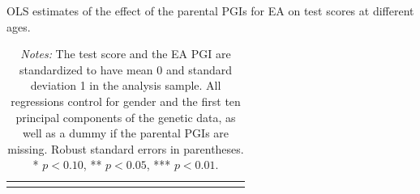 \documentclass[12pt,a4paper]{article}
\begin{document}
\begin{bibunit}
\addtolength{\tabcolsep}{0.3em}
\begin{table}[H]
\caption{OLS estimates of the effect of the parental PGIs for EA on test scores at different ages.}
\centering
{\footnotesize
\begin{tabular}{lcccccccccccccccccccc}
\toprule

\bottomrule
\addlinespace[.75ex]
\end{tabular}
\label{tab:PredictivePowerApp}
}
\caption*{\footnotesize \noindent \textit{Notes:} The test score and the EA PGI are standardized to have mean 0 and standard deviation 1 in the analysis sample. All regressions control for gender and the first ten principal components of the genetic data, as well as a dummy if the parental PGIs are missing. Robust standard errors in parentheses. * $p < 0.10$, ** $p < 0.05$, *** $p < 0.01$.}
\end{table}

\clearpage 
\begin{spacing}{1.0}
\setlength{\bibsep}{0.0pt}
\renewcommand\refname{References (Appendix)}
\putbib[genes]
\end{spacing}
\end{bibunit}
\end{document}
